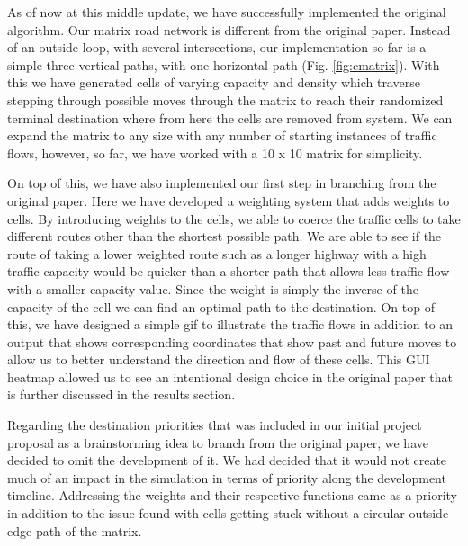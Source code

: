 \documentclass[sigplan,screen]{acmart}
\begin{document}

As of now at this middle update, we have successfully implemented the original
algorithm. Our matrix road network is different from the original paper. Instead
of an outside loop, with several intersections, our implementation so far is a
simple three vertical paths, with one horizontal path (Fig. \ref{fig:cmatrix}).
With this we have generated cells of varying capacity and density which traverse
stepping through possible moves through the matrix to reach their randomized
terminal destination where from here the cells are removed from system. We can
expand the matrix to any size with any number of starting instances of traffic
flows, however, so far, we have worked with a 10 x 10 matrix for simplicity. 

On top of this, we have also implemented our first step in branching from the
original paper. Here we have developed a weighting system that adds weights to
cells.  By introducing weights to the cells, we able to coerce the traffic cells
to take different routes other than the shortest possible path. We are able to
see if the route of taking a lower weighted route such as a longer highway with
a high traffic capacity would be quicker than a shorter path that allows less
traffic flow with a smaller capacity value. Since the weight is simply the
inverse of the capacity of the cell we can find an optimal path to the
destination. On top of this, we have designed a simple gif to illustrate the
traffic flows in addition to an output that shows corresponding coordinates that
show past and future moves to allow us to better understand the direction and
flow of these cells. This GUI heatmap allowed us to see an intentional design
choice in the original paper that is further discussed in the results section.  

Regarding the destination priorities that was included in our initial project
proposal as a brainstorming idea to branch from the original paper, we have
decided to omit the development of it. We had decided that it would not create
much of an impact in the simulation in terms of priority along the development
timeline. Addressing the weights and their respective functions came as a
priority in addition to the issue found with cells getting stuck without a
circular outside edge path of the matrix.  
\end{document}
